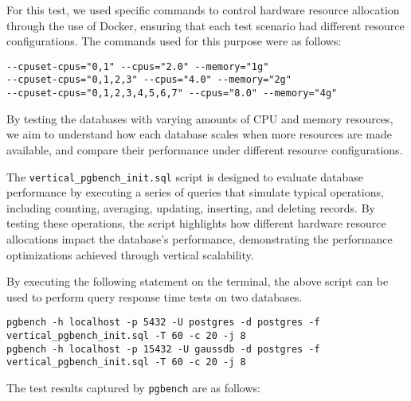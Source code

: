 \documentclass[12pt,a4paper,cs4size]{ctexart}
\begin{document}
For this test, we used specific commands to control hardware resource allocation through the use of Docker, ensuring that each test scenario had different resource configurations. The commands used for this purpose were as follows:

\begin{lstlisting}[style=C++]
--cpuset-cpus="0,1" --cpus="2.0" --memory="1g"
--cpuset-cpus="0,1,2,3" --cpus="4.0" --memory="2g"
--cpuset-cpus="0,1,2,3,4,5,6,7" --cpus="8.0" --memory="4g"
\end{lstlisting}

By testing the databases with varying amounts of CPU and memory resources, we aim to understand how each database scales when more resources are made available, and compare their performance under different resource configurations.

The \texttt{vertical\_pgbench\_init.sql}\cite{github2024} script is designed to evaluate database performance by executing a series of queries that simulate typical operations, including counting, averaging, updating, inserting, and deleting records. By testing these operations, the script highlights how different hardware resource allocations impact the database's performance, demonstrating the performance optimizations achieved through vertical scalability.

By executing the following statement on the terminal, the above script can be used to perform query response time tests on two databases.

\begin{lstlisting}[style=C++]
pgbench -h localhost -p 5432 -U postgres -d postgres -f vertical_pgbench_init.sql -T 60 -c 20 -j 8
pgbench -h localhost -p 15432 -U gaussdb -d postgres -f vertical_pgbench_init.sql -T 60 -c 20 -j 8
\end{lstlisting}

The test results captured by \texttt{pgbench} are as follows:
\end{document}
